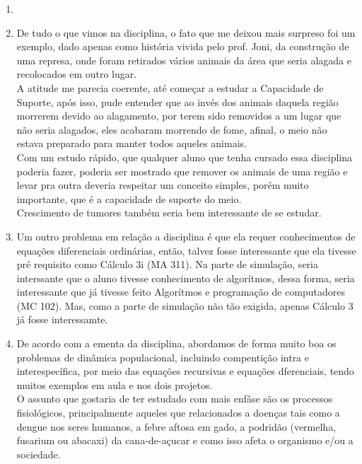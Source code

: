 \documentclass[a4paper]{article}
\begin{document}
\begin{enumerate}
\\
\item
\\
\item
De tudo o que vimos na disciplina, o fato que me deixou mais surpreso foi um exemplo, dado apenas como hist\'oria vivida pelo prof. Joni, da constru\c{c}\~ao de uma represa, onde foram retirados v\'arios animais da \'area que seria alagada e recolocados em outro lugar.
\\
A atitude me parecia coerente, at\'e come\c{c}ar a estudar a Capacidade de Suporte, ap\'os isso, pude entender que ao inv\'es dos animais daquela regi\~ao morrerem devido ao alagamento, por terem sido removidos a um lugar que n\~ao seria alagados, eles acabaram morrendo de fome, afinal, o meio n\~ao estava preparado para manter todos aqueles animais.
\\
Com um estudo r\'apido, que qualquer aluno que tenha cursado essa disciplina poderia fazer, poderia ser mostrado que remover os animais de uma regi\~ao e levar pra outra deveria respeitar um conceito simples, por\'em muito importante, que \'e a capacidade de suporte do meio.
\\
Crescimento de tumores tamb\'em seria bem interessante de se estudar.
\\
\item
Um outro problema em rela\c{c}\~ao a disciplina \'e que ela requer conhecimentos de equa\c{c}\~oes diferenciais ordin\'arias, ent\~ao, talvez fosse interessante que ela tivesse pr\'e requisito como C\'alculo 3i (MA 311). Na parte de simula\c{c}\~ao, seria interssante que o aluno tivesse conhecimento de algor\'itmos, dessa forma, seria interessante que j\'a tivesse feito Algor\'itmos e programa\c{c}\~ao de computadores (MC 102). Mas, como a parte de simula\c{c}\~ao n\~ao t\~ao exigida, apenas C\'alculo 3 j\'a fosse interessamte. 
\\
\item
De acordo com a ementa da disciplina, abordamos de forma muito boa os problemas de din\^amica populacional, incluindo compenti\c{c}\~ao intra e interespec\'ifica, por meio das equa\c{c}\~oes recursivas e equa\c{c}\~oes dferenciais, tendo muitos exemplos em aula e nos dois projetos. 
\\
O assunto que gostaria de ter estudado com mais enf\^ase são os processos fisiol\'ogicos, principalmente aqueles que relacionados a doen\c{c}as tais como a dengue nos seres humanos, a febre aftosa em gado, a podrid\~ao (vermelha, fusarium ou abacaxi) da cana-de-a\c{c}ucar e como isso afeta o organismo e/ou a sociedade. 

\end{enumerate}
\end{document}
